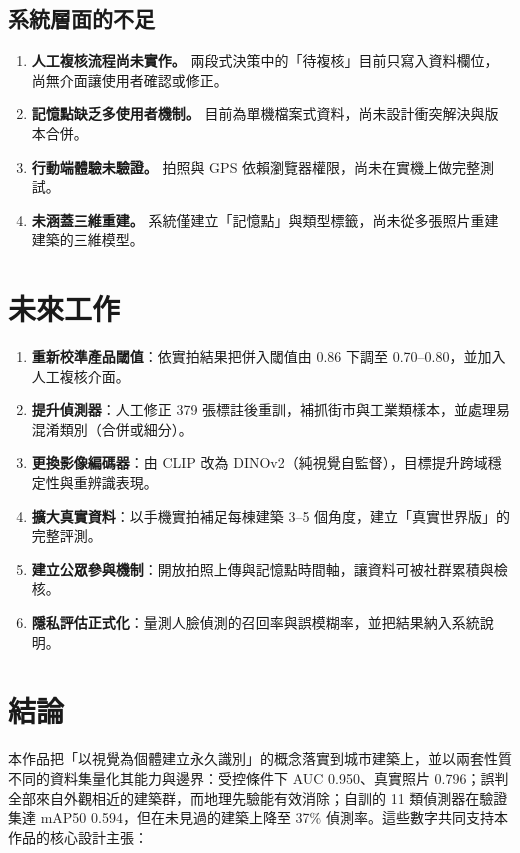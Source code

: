 \documentclass[11pt,a4paper,fontset=windows]{ctexart}
\begin{document}
\subsection{系統層面的不足}
\begin{enumerate}[leftmargin=1.4em,itemsep=2pt]
  \item \textbf{人工複核流程尚未實作。} 兩段式決策中的「待複核」目前只寫入資料欄位，尚無介面讓使用者確認或修正。
  \item \textbf{記憶點缺乏多使用者機制。} 目前為單機檔案式資料，尚未設計衝突解決與版本合併。
  \item \textbf{行動端體驗未驗證。} 拍照與 GPS 依賴瀏覽器權限，尚未在實機上做完整測試。
  \item \textbf{未涵蓋三維重建。} 系統僅建立「記憶點」與類型標籤，尚未從多張照片重建建築的三維模型。
\end{enumerate}

\section{未來工作}
\begin{enumerate}[leftmargin=1.4em,itemsep=2pt]
  \item \textbf{重新校準產品閾值}：依實拍結果把併入閾值由 0.86 下調至 0.70--0.80，並加入人工複核介面。
  \item \textbf{提升偵測器}：人工修正 379 張標註後重訓，補抓街市與工業類樣本，並處理易混淆類別（合併或細分）。
  \item \textbf{更換影像編碼器}：由 CLIP 改為 DINOv2（純視覺自監督），目標提升跨域穩定性與重辨識表現。
  \item \textbf{擴大真實資料}：以手機實拍補足每棟建築 3--5 個角度，建立「真實世界版」的完整評測。
  \item \textbf{建立公眾參與機制}：開放拍照上傳與記憶點時間軸，讓資料可被社群累積與檢核。
  \item \textbf{隱私評估正式化}：量測人臉偵測的召回率與誤模糊率，並把結果納入系統說明。
\end{enumerate}

\section{結論}
本作品把「以視覺為個體建立永久識別」的概念落實到城市建築上，並以兩套性質不同的資料集量化其能力與邊界：受控條件下 AUC 0.950、真實照片 0.796；誤判全部來自外觀相近的建築群，而地理先驗能有效消除；自訓的 11 類偵測器在驗證集達 mAP50 0.594，但在未見過的建築上降至 37\% 偵測率。這些數字共同支持本作品的核心設計主張：
\end{document}
